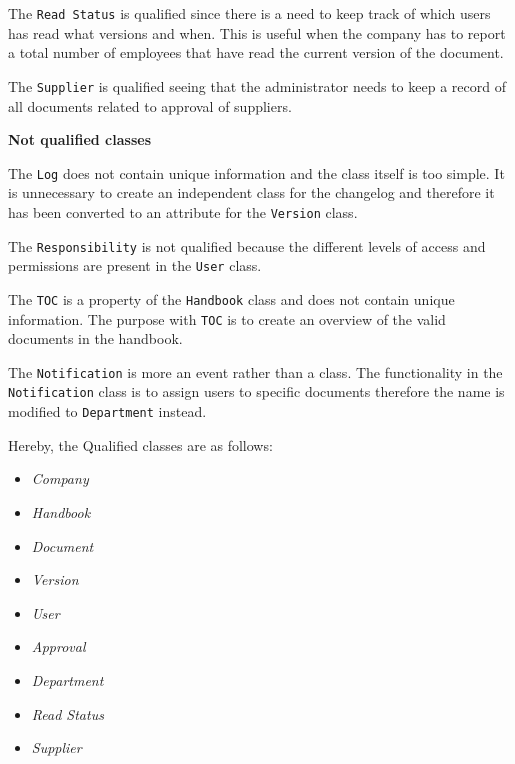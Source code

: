 The \texttt{Read Status} is qualified since there is a need to keep track of which users has read what versions and when.
This is useful when the company has to report a total number of employees that have read the current version of the document.

The \texttt{Supplier} is qualified seeing that the administrator needs to keep a record of all documents related to approval of suppliers.

\textbf{Not qualified classes}

The \texttt{Log} does not contain unique information and the class itself is too simple.
It is unnecessary to create an independent class for the changelog and therefore it has been converted to an attribute for the \texttt{Version} class.

The \texttt{Responsibility} is not qualified because the different levels of access and permissions are present in the \texttt{User} class.

The \texttt{TOC} is a property of the \texttt{Handbook} class and does not contain unique information.
The purpose with \texttt{TOC} is to create an overview of the valid documents in the handbook.

The \texttt{Notification} is more an event rather than a class.
The functionality in the \texttt{Notification} class is to assign users to specific documents therefore the name is modified to \texttt{Department} instead.

Hereby, the Qualified classes are as follows:
\begin{multicols}{4}
	\begin{itemize}
	\item \textit{Company}
	\item \textit{Handbook}
	\item \textit{Document}
	\item \textit{Version}
	\item \textit{User}
	\item \textit{Approval}
	\item \textit{Department}
	\item \textit{Read Status}
	\item \textit{Supplier}
	\end{itemize}
\end{multicols}

